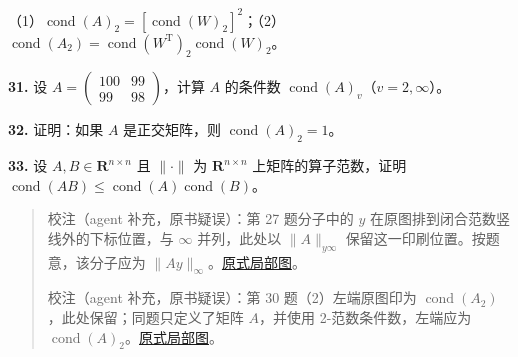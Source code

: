 \documentclass[
  10pt,
  fontset=fandol]{ctexart}
\begin{document}
（1）\(\operatorname{cond}(A)_2=[\operatorname{cond}(W)_2]^2\)；（2）\(\operatorname{cond}(A_2)=\operatorname{cond}(W^{\mathrm T})_2\operatorname{cond}(W)_2\)。

\textbf{31.} 设 \(A=\begin{pmatrix}100&99\\99&98\end{pmatrix}\)，计算
\(A\) 的条件数 \(\operatorname{cond}(A)_v\)（\(v=2,\infty\)）。

\textbf{32.} 证明：如果 \(A\) 是正交矩阵，则
\(\operatorname{cond}(A)_2=1\)。

\textbf{33.} 设 \(A,B\in\mathbf R^{n\times n}\) 且 \(\|\cdot\|\) 为
\(\mathbf R^{n\times n}\) 上矩阵的算子范数，证明
\(\operatorname{cond}(AB)\leqslant\operatorname{cond}(A)\operatorname{cond}(B)\)。

\begin{quote}
校注（agent 补充，原书疑误）：第 27 题分子中的 \(y\)
在原图排到闭合范数竖线外的下标位置，与 \(\infty\) 并列，此处以
\(\|A\|_{y\infty}\) 保留这一印刷位置。按题意，该分子应为
\(\|Ay\|_\infty\)。\href{/Users/xiangjunfeng/Desktop/数值计算专用/numerical-analysis/book/staging/ch07b/assets/214-ex27.png}{原式局部图}。

校注（agent 补充，原书疑误）：第 30 题（2）左端原图印为
\(\operatorname{cond}(A_2)\)，此处保留；同题只定义了矩阵 \(A\)，并使用
2-范数条件数，左端应为
\(\operatorname{cond}(A)_2\)。\href{/Users/xiangjunfeng/Desktop/数值计算专用/numerical-analysis/book/staging/ch07b/assets/214-ex30.png}{原式局部图}。
\end{quote}
\end{document}
